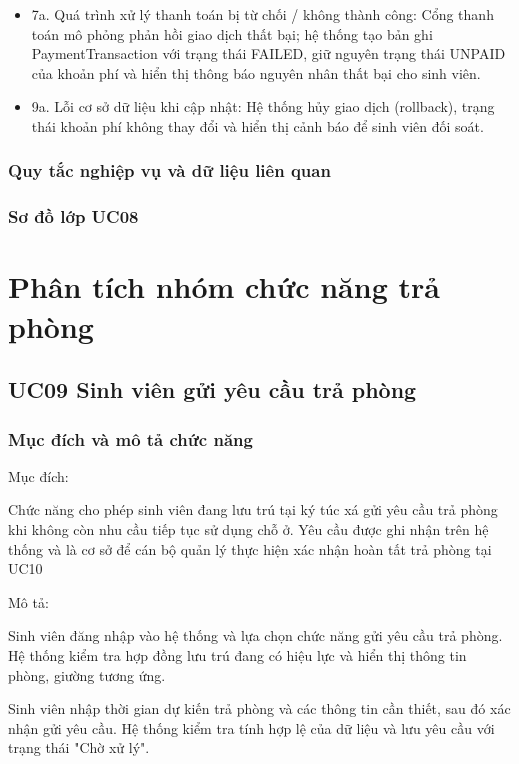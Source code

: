 \begin{itemize}[leftmargin=1.4em]
\item 7a. Quá trình xử lý thanh toán bị từ chối / không thành công: Cổng thanh toán mô phỏng phản hồi giao dịch thất bại; hệ thống tạo bản ghi PaymentTransaction với trạng thái FAILED, giữ nguyên trạng thái UNPAID của khoản phí và hiển thị thông báo nguyên nhân thất bại cho sinh viên.
\item 9a. Lỗi cơ sở dữ liệu khi cập nhật: Hệ thống hủy giao dịch (rollback), trạng thái khoản phí không thay đổi và hiển thị cảnh báo để sinh viên đối soát.
\end{itemize}

\subsubsection{Quy tắc nghiệp vụ và dữ liệu liên quan}


\subsubsection{Sơ đồ lớp UC08}


\section{Phân tích nhóm chức năng trả phòng}

\subsection{UC09 Sinh viên gửi yêu cầu trả phòng}

\subsubsection{Mục đích và mô tả chức năng}

Mục đích:

Chức năng cho phép sinh viên đang lưu trú tại ký túc xá gửi yêu cầu trả phòng khi không còn nhu cầu tiếp tục sử dụng chỗ ở. Yêu cầu được ghi nhận trên hệ thống và là cơ sở để cán bộ quản lý thực hiện xác nhận hoàn tất trả phòng tại UC10

Mô tả:

Sinh viên đăng nhập vào hệ thống và lựa chọn chức năng gửi yêu cầu trả phòng. Hệ thống kiểm tra hợp đồng lưu trú đang có hiệu lực và hiển thị thông tin phòng, giường tương ứng.

Sinh viên nhập thời gian dự kiến trả phòng và các thông tin cần thiết, sau đó xác nhận gửi yêu cầu. Hệ thống kiểm tra tính hợp lệ của dữ liệu và lưu yêu cầu với trạng thái "Chờ xử lý".

